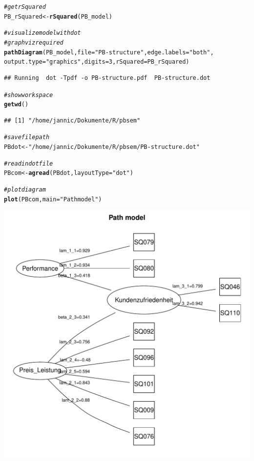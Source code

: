 \documentclass{article}\usepackage[]{graphicx}\usepackage[]{color}
\makeatletter
\def\maxwidth{ %
  \ifdim\Gin@nat@width>\linewidth
    \linewidth
  \else
    \Gin@nat@width
  \fi
}
\newcommand{\hlnum}[1]{\textcolor[rgb]{0.686,0.059,0.569}{#1}}%
\newcommand{\hlstr}[1]{\textcolor[rgb]{0.192,0.494,0.8}{#1}}%
\newcommand{\hlcom}[1]{\textcolor[rgb]{0.678,0.584,0.686}{\textit{#1}}}%
\newcommand{\hlstd}[1]{\textcolor[rgb]{0.345,0.345,0.345}{#1}}%
\newcommand{\hlkwb}[1]{\textcolor[rgb]{0.69,0.353,0.396}{#1}}%
\newcommand{\hlkwc}[1]{\textcolor[rgb]{0.333,0.667,0.333}{#1}}%
\newcommand{\hlkwd}[1]{\textcolor[rgb]{0.737,0.353,0.396}{\textbf{#1}}}%
\newenvironment{kframe}{%
 \def\at@end@of@kframe{}%
 \ifinner\ifhmode%
  \def\at@end@of@kframe{\end{minipage}}%
  \begin{minipage}{\columnwidth}%
 \fi\fi%
 \def\FrameCommand##1{\hskip\@totalleftmargin \hskip-\fboxsep
 \colorbox{shadecolor}{##1}\hskip-\fboxsep
     \hskip-\linewidth \hskip-\@totalleftmargin \hskip\columnwidth}%
 \MakeFramed {\advance\hsize-\width
   \@totalleftmargin\z@ \linewidth\hsize
   \@setminipage}}%
 {\par\unskip\endMakeFramed%
 \at@end@of@kframe}
\newenvironment{knitrout}{}{} %
\makeatother
\begin{document}
\begin{knitrout}
\begin{kframe}
\begin{alltt}
\hlcom{#get rSquared}
\hlstd{PB_rSquared} \hlkwb{<-} \hlkwd{rSquared}\hlstd{(PB_model)}

\hlcom{#visualize model with dot }
\hlcom{#graphviz required}
\hlkwd{pathDiagram}\hlstd{(PB_model,} \hlkwc{file} \hlstd{=} \hlstr{"PB-structure"}\hlstd{,} \hlkwc{edge.labels} \hlstd{=} \hlstr{"both"}\hlstd{,}
           \hlkwc{output.type} \hlstd{=} \hlstr{"graphics"}\hlstd{,} \hlkwc{digits} \hlstd{=} \hlnum{3}\hlstd{,} \hlkwc{rSquared}\hlstd{=PB_rSquared)}
\end{alltt}
\begin{verbatim}
## Running  dot -Tpdf -o PB-structure.pdf  PB-structure.dot
\end{verbatim}
\begin{alltt}
\hlcom{#show workspace}
\hlkwd{getwd}\hlstd{()}
\end{alltt}
\begin{verbatim}
## [1] "/home/jannic/Dokumente/R/pbsem"
\end{verbatim}
\begin{alltt}
\hlcom{#save filepath}
\hlstd{PBdot} \hlkwb{<-} \hlstr{"/home/jannic/Dokumente/R/pbsem/PB-structure.dot"}

\hlcom{#read in dot file}
\hlstd{PBcom} \hlkwb{<-} \hlkwd{agread}\hlstd{(PBdot,} \hlkwc{layoutType}\hlstd{=}\hlstr{"dot"}\hlstd{)}

\hlcom{#plot diagram}
\hlkwd{plot}\hlstd{(PBcom,} \hlkwc{main}\hlstd{=}\hlstr{"Path model"}\hlstd{)}
\end{alltt}
\end{kframe}
\includegraphics[width=\maxwidth]{figure/semPLS-2} 

\end{knitrout}
\end{document}
